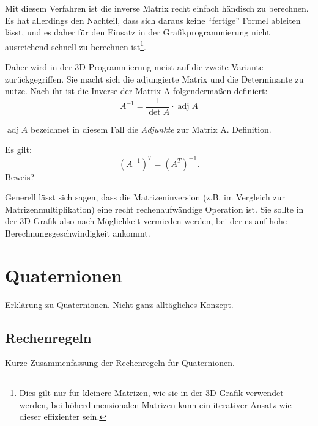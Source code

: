 Mit diesem Verfahren ist die inverse Matrix recht einfach händisch zu berechnen. Es hat allerdings den Nachteil, dass sich daraus keine \enquote{fertige} Formel ableiten lässt, und es daher für den Einsatz in der Grafikprogrammierung nicht ausreichend schnell zu berechnen ist\footnote{Dies gilt nur für kleinere Matrizen, wie sie in der 3D-Grafik verwendet werden, bei höherdimensionalen Matrizen kann ein iterativer Ansatz wie dieser effizienter sein.}.

Daher wird in der 3D-Programmierung meist auf die zweite Variante zurückgegriffen. Sie macht sich die adjungierte Matrix und die Determinante zu nutze. Nach ihr ist die Inverse der Matrix A folgendermaßen definiert:
\begin{equation}
 A^{-1} = \frac{1}{\det A} \cdot \operatorname{adj} A
\end{equation}

$\operatorname{adj} A$ bezeichnet in diesem Fall die \emph{Adjunkte} zur Matrix A. Definition.

Es gilt:
\begin{equation}
 (A^{-1})^T = (A^T)^{-1}.
\end{equation}
Beweis?

Generell lässt sich sagen, dass die Matrizeninversion (z.B. im Vergleich zur Matrizenmultiplikation) eine recht rechenaufwändige Operation ist. Sie sollte in der 3D-Grafik also nach Möglichkeit vermieden werden, bei der es auf hohe Berechnungsgeschwindigkeit ankommt.

\section{Quaternionen}
Erklärung zu Quaternionen. Nicht ganz alltägliches Konzept.

\subsection{Rechenregeln}
Kurze Zusammenfassung der Rechenregeln für Quaternionen.